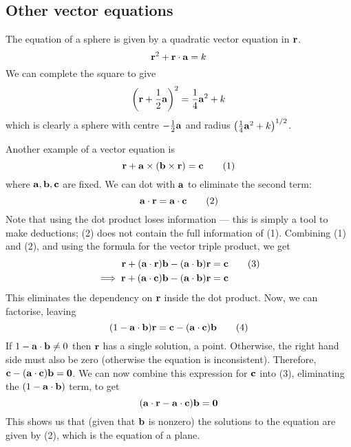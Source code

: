 \subsection{Other vector equations}
The equation of a sphere is given by a quadratic vector equation in \(\vb r\).
\[
	\vb r^2 + \vb r \cdot \vb a = k
\]
We can complete the square to give
\[
	\left(\vb r + \frac 1 2 \vb a \right)^2 = \frac 1 4 \vb a^2 + k
\]
which is clearly a sphere with centre \(-\frac 1 2 \vb a\) and radius \(\left( \frac 1 4 \vb a^2 + k \right)^{1/2}\).

Another example of a vector equation is
\[
	\vb r + \vb a \times (\vb b \times \vb r) = \vb c \tag{1}
\]
where \(\vb a, \vb b, \vb c\) are fixed.
We can dot with \(\vb a\) to eliminate the second term:
\[
	\vb a \cdot \vb r = \vb a \cdot \vb c \tag{2}
\]
Note that using the dot product loses information --- this is simply a tool to make deductions; (2) does not contain the full information of (1).
Combining (1) and (2), and using the formula for the vector triple product, we get
\begin{align*}
	\vb r + (\vb a \cdot \vb r) \vb b - (\vb a \cdot \vb b) \vb r          & = \vb c \tag{3} \\
	\implies \vb r + (\vb a \cdot \vb c) \vb b - (\vb a \cdot \vb b) \vb r & = \vb c
\end{align*}
This eliminates the dependency on \(\vb r\) inside the dot product.
Now, we can factorise, leaving
\[
	(1 - \vb a \cdot \vb b) \vb r = \vb c - (\vb a \cdot \vb c) \vb b \tag{4}
\]
If \(1 - \vb a \cdot \vb b \neq 0\) then \(\vb r\) has a single solution, a point.
Otherwise, the right hand side must also be zero (otherwise the equation is inconsistent).
Therefore, \(\vb c - (\vb a \cdot \vb c)\vb b = \vb 0\).
We can now combine this expression for \(\vb c\) into (3), eliminating the \((1- \vb a \cdot \vb b)\) term, to get
\[
	(\vb a \cdot \vb r - \vb a \cdot \vb c) \vb b = \vb 0
\]
This shows us that (given that \(\vb b\) is nonzero) the solutions to the equation are given by (2), which is the equation of a plane.

